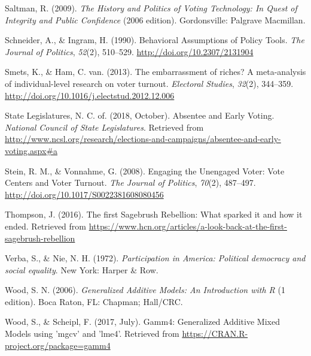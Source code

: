 \documentclass[12pt,twoside]{reedthesis}
\begin{document}
  \hypertarget{ref-saltman_history_2009}{}
  Saltman, R. (2009). \emph{The History and Politics of Voting Technology:
  In Quest of Integrity and Public Confidence} (2006 edition).
  Gordonsville: Palgrave Macmillan.
  
  \hypertarget{ref-schneider_behavioral_1990}{}
  Schneider, A., \& Ingram, H. (1990). Behavioral Assumptions of Policy
  Tools. \emph{The Journal of Politics}, \emph{52}(2), 510--529.
  \url{http://doi.org/10.2307/2131904}
  
  \hypertarget{ref-smets_embarrassment_2013}{}
  Smets, K., \& Ham, C. van. (2013). The embarrassment of riches? A
  meta-analysis of individual-level research on voter turnout.
  \emph{Electoral Studies}, \emph{32}(2), 344--359.
  \url{http://doi.org/10.1016/j.electstud.2012.12.006}
  
  \hypertarget{ref-national_council_of_state_legislatures_absentee_2018}{}
  State Legislatures, N. C. of. (2018, October). Absentee and Early
  Voting. \emph{National Council of State Legislatures}. Retrieved from
  \url{http://www.ncsl.org/research/elections-and-campaigns/absentee-and-early-voting.aspx\#a}
  
  \hypertarget{ref-stein_engaging_2008}{}
  Stein, R. M., \& Vonnahme, G. (2008). Engaging the Unengaged Voter: Vote
  Centers and Voter Turnout. \emph{The Journal of Politics}, \emph{70}(2),
  487--497. \url{http://doi.org/10.1017/S0022381608080456}
  
  \hypertarget{ref-thompson_first_2016}{}
  Thompson, J. (2016). The first Sagebrush Rebellion: What sparked it and
  how it ended. Retrieved from
  \url{https://www.hcn.org/articles/a-look-back-at-the-first-sagebrush-rebellion}
  
  \hypertarget{ref-verba_participation_1972}{}
  Verba, S., \& Nie, N. H. (1972). \emph{Participation in America:
  Political democracy and social equality}. New York: Harper \& Row.
  
  \hypertarget{ref-wood_generalized_2006}{}
  Wood, S. N. (2006). \emph{Generalized Additive Models: An Introduction
  with R} (1 edition). Boca Raton, FL: Chapman; Hall/CRC.
  
  \hypertarget{ref-wood_gamm4:_2017}{}
  Wood, S., \& Scheipl, F. (2017, July). Gamm4: Generalized Additive Mixed
  Models using 'mgcv' and 'lme4'. Retrieved from
  \url{https://CRAN.R-project.org/package=gamm4}


\end{document}
